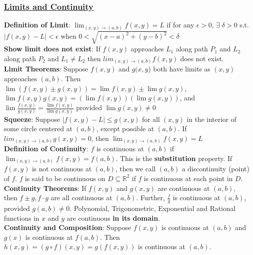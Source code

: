 \documentclass{article}
\begin{document}
\begin{multicols*}{3}
\subsubsection*{\underline{Limits and Continuity}}
\textbf{Definition of Limit}: $\lim_{(x,y)\to(a,b)}f(x,y)=L$ if for any $\epsilon>0$, $\exists\;\delta>0$ s.t. $|f(x,y)-L|<\epsilon$ when $0<\sqrt{(x-a)^2+(y-b)^2}<\delta$ \\
\textbf{Show limit does not exist}: If $f(x,y)$ approaches $L_1$ along path $P_1$ and $L_2$ along path $P_2$ and $L_1\not=L_2$ then $lim_{(x,y)\to(a,b)}f(x,y)$ does not exist.\\
\textbf{Limit Theorems}: Suppose $f(x,y)$ and $g(x,y$) both have limits as $(x,y)$ approaches $(a, b)$. Then $\lim (f(x,y)\pm g(x,y))=\lim f(x,y)\pm \lim g(x,y)$, $\lim f(x,y)g(x,y)=(\lim f(x,y))(\lim g(x,y))$, and $\lim \frac{f(x,y)}{g(x,y)}=\frac{\lim f(x,y)}{\lim g(x,y)}$ provided $\lim g(x,y)\not=0$\\
\textbf{Squeeze}: Suppose $|f(x,y) - L| \leq g(x,y)$ for all $(x,y)$ in the interior of some circle centered at $(a, b)$, except possible at $(a, b)$. If $lim_{(x,y)\to(a,b)}g(x,y)=0$, then $\lim_{(x,y)\to (a,b)}f(x,y)=L$ \\
\textbf{Definition of Continuity}: $f$ is continuous at $(a,b)$ if $\lim_{(x,y)\to(a,b)}f(x,y)=f(a,b)$. This is the \textbf{substitution} property. If $f(x,y)$ is not continuous at $(a,b)$, then we call $(a,b)$ a
discontinuity (point) of $f$. $f$ is said to be continuous on $D \subseteq \mathbb{R}^2$ if $f$ is continuous at each point in $D$. \\
\textbf{Continuity Theorems}: If $f(x,y)$ and $g(x,y)$ are continuous at $(a,b)$, then $f\pm g,f \cdot g$ are all continuous at $(a, b)$. Further, $\frac{f}{g}$ is continuous at $(a, b)$, provided $g(a, b)\not= 0$. Polynomial, Trigonometric, Exponential and Rational functions in $x$ and $y$ are continuous \textbf{in its domain}. \\
\textbf{Continuity and Composition}: Suppose $f(x,y)$ is continuous at $(a,b)$ and $g(x)$ is continuous at $f (a, b)$. Then $h(x,y) = (g\circ f)(x,y) = g(f(x,y))$  is continuous at $(a, b)$.

\end{multicols*}
\end{document}

